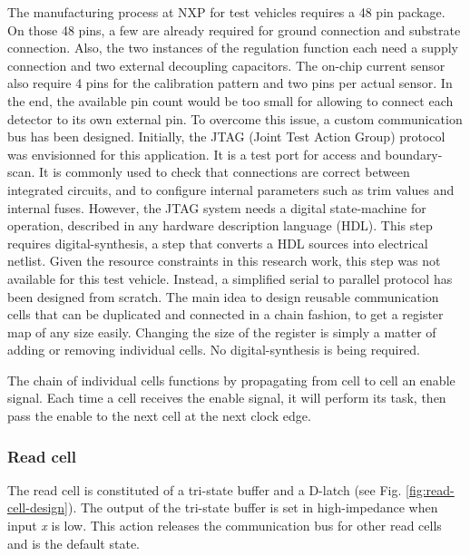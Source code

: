 The manufacturing process at NXP for test vehicles requires a 48 pin package.
On those 48 pins, a few are already required for ground connection and substrate connection.
Also, the two instances of the regulation function each need a supply connection and two external decoupling capacitors.
The on-chip current sensor also require 4 pins for the calibration pattern and two pins per actual sensor.
In the end, the available pin count would be too small for allowing to connect each detector to its own external pin.
To overcome this issue, a custom communication bus has been designed.
Initially, the JTAG (Joint Test Action Group) \cite{jtag} protocol was envisionned for this application.
It is a test port for access and boundary-scan.
It is commonly used to check that connections are correct between integrated circuits, and to configure internal parameters such as trim values and internal fuses.
However, the JTAG system needs a digital state-machine for operation, described in any hardware description language (HDL).
This step requires digital-synthesis, a step that converts a HDL sources into electrical netlist.
Given the resource constraints in this research work, this step was not available for this test vehicle.
Instead, a simplified serial to parallel protocol has been designed from scratch.
The main idea to design reusable communication cells that can be duplicated and connected in a chain fashion, to get a register map of any size easily.
Changing the size of the register is simply a matter of adding or removing individual cells.
No digital-synthesis is being required.

The chain of individual cells functions by propagating from cell to cell an enable signal.
Each time a cell receives the enable signal, it will perform its task, then pass the enable to the next cell at the next clock edge.


\subsubsection{Read cell}

The read cell is constituted of a tri-state buffer and a D-latch (see Fig. \ref{fig:read-cell-design}).
The output of the tri-state buffer is set in high-impedance when input \textit{x} is low.
This action releases the communication bus for other read cells and is the default state.

